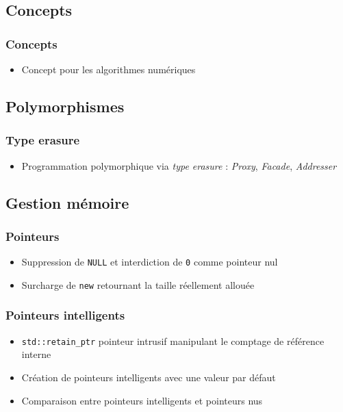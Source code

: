 \documentclass[C++.tex]{subfiles}
\begin{document}
\subsection*{Concepts}
\begin{frame}[fragile]
	\frametitle{Concepts}
	\begin{itemize}
		\item Concept pour les algorithmes numériques
	\end{itemize}
\end{frame}

\subsection*{Polymorphismes}
\begin{frame}[fragile]
	\frametitle{Type erasure}
	\begin{itemize}
		\item Programmation polymorphique via \textit{type erasure} : \textit{Proxy}, \textit{Facade}, \textit{Addresser}

	\end{itemize}
\end{frame}

\subsection*{Gestion mémoire}
\begin{frame}[fragile]
	\frametitle{Pointeurs}
	\begin{itemize}
		\item Suppression de \lstinline|NULL| et interdiction de \lstinline|0| comme pointeur nul
		\item Surcharge de \lstinline|new| retournant la taille réellement allouée
	\end{itemize}
\end{frame}

\begin{frame}[fragile]
	\frametitle{Pointeurs intelligents}
	\begin{itemize}
		\item \lstinline|std::retain_ptr| pointeur intrusif manipulant le comptage de référence interne
		\item Création de pointeurs intelligents avec une valeur par défaut
		\item Comparaison entre pointeurs intelligents et pointeurs nus
	\end{itemize}
\end{frame}
\end{document}
